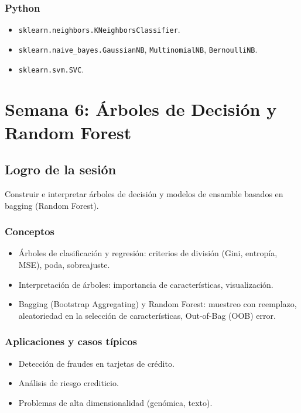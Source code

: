 \documentclass[12pt,a4paper,openany,oneside]{book}
\begin{document}
\subsection{Python}
\begin{itemize}
    \item \texttt{sklearn.neighbors.KNeighborsClassifier}.
    \item \texttt{sklearn.naive\_bayes.GaussianNB}, \texttt{MultinomialNB}, \texttt{BernoulliNB}.
    \item \texttt{sklearn.svm.SVC}.
\end{itemize}

\chapter{Semana 6: Árboles de Decisión y Random Forest}

\section{Logro de la sesión}
Construir e interpretar árboles de decisión y modelos de ensamble basados en bagging (Random Forest).

\subsection{Conceptos}
\begin{itemize}
    \item Árboles de clasificación y regresión: criterios de división (Gini, entropía, MSE), poda, sobreajuste.
    \item Interpretación de árboles: importancia de características, visualización.
    \item Bagging (Bootstrap Aggregating) y Random Forest: muestreo con reemplazo, aleatoriedad en la selección de características, Out-of-Bag (OOB) error.
\end{itemize}

\subsection{Aplicaciones y casos típicos}
\begin{itemize}
    \item Detección de fraudes en tarjetas de crédito.
    \item Análisis de riesgo crediticio.
    \item Problemas de alta dimensionalidad (genómica, texto).
\end{itemize}
\end{document}
